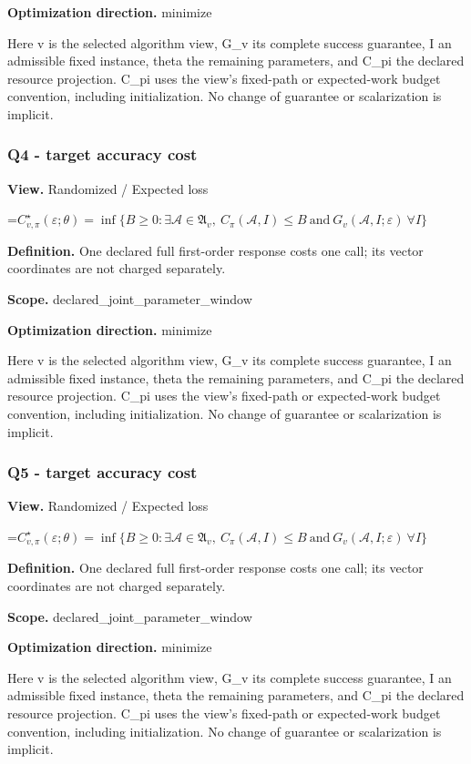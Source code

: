 \documentclass[10pt,a4paper]{article}
\newcommand{\AtlasMath}[1]{\par\begingroup\centering\setbox0=\hbox{$\displaystyle #1$}\ifdim\wd0>1.4\linewidth\typeout{ATLAS WIDE FORMULA: \the\wd0}\fi\ifdim\wd0>\linewidth\resizebox{\linewidth}{!}{\box0}\else\box0\fi\par\endgroup}
\begin{document}
\textbf{Optimization direction.} minimize

Here v is the selected algorithm view, G\_v its complete success guarantee, I an admissible fixed instance, theta the remaining parameters, and C\_pi the declared resource projection. C\_pi uses the view's fixed-path or expected-work budget convention, including initialization. No change of guarantee or scalarization is implicit.

\subsubsection{Q4 - target accuracy cost}
\textbf{View.} Randomized / Expected loss

\AtlasMath{C^\star_{v,\pi}(\varepsilon;\theta)=\inf\{B\ge0:\exists\mathcal A\in\mathfrak A_v,\ C_\pi(\mathcal A,I)\le B\ \text{and}\ G_v(\mathcal A,I;\varepsilon)\ \forall I\}}
\textbf{Definition.} One declared full first-order response costs one call; its vector coordinates are not charged separately.

\textbf{Scope.} declared\_joint\_parameter\_window

\textbf{Optimization direction.} minimize

Here v is the selected algorithm view, G\_v its complete success guarantee, I an admissible fixed instance, theta the remaining parameters, and C\_pi the declared resource projection. C\_pi uses the view's fixed-path or expected-work budget convention, including initialization. No change of guarantee or scalarization is implicit.

\subsubsection{Q5 - target accuracy cost}
\textbf{View.} Randomized / Expected loss

\AtlasMath{C^\star_{v,\pi}(\varepsilon;\theta)=\inf\{B\ge0:\exists\mathcal A\in\mathfrak A_v,\ C_\pi(\mathcal A,I)\le B\ \text{and}\ G_v(\mathcal A,I;\varepsilon)\ \forall I\}}
\textbf{Definition.} One declared full first-order response costs one call; its vector coordinates are not charged separately.

\textbf{Scope.} declared\_joint\_parameter\_window

\textbf{Optimization direction.} minimize

Here v is the selected algorithm view, G\_v its complete success guarantee, I an admissible fixed instance, theta the remaining parameters, and C\_pi the declared resource projection. C\_pi uses the view's fixed-path or expected-work budget convention, including initialization. No change of guarantee or scalarization is implicit.
\end{document}
